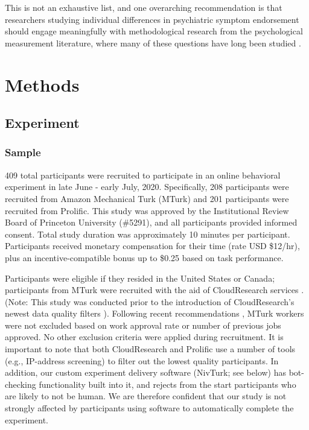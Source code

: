 \documentclass[a4paper,notitlepage,12pt]{article}
\begin{document}
\begin{refsection}[main]
\begin{itemize}
\end{itemize}

This is not an exhaustive list, and one overarching recommendation is that researchers studying individual differences in psychiatric symptom endorsement should engage meaningfully with methodological research from the psychological measurement literature, where many of these questions have long been studied \cite{huang2015insufficient, curran2016methods, thomas2017validity, desimone2018dirty, ophir2020turker}.


\section*{Methods}

\subsection*{Experiment}

\subsubsection*{Sample}

409 total participants were recruited to participate in an online behavioral experiment in late June - early July, 2020. Specifically, 208 participants were recruited from Amazon Mechanical Turk (MTurk) and 201 participants were recruited from Prolific. This study was approved by the Institutional Review Board of Princeton University (\#5291), and all participants provided informed consent. Total study duration was approximately 10 minutes per participant. Participants received monetary compensation for their time (rate USD \$12/hr), plus an incentive-compatible bonus up to \$0.25 based on task performance. 

Participants were eligible if they resided in the United States or Canada; participants from MTurk were recruited with the aid of CloudResearch services \cite{litman2017turkprime}. (Note: This study was conducted prior to the introduction of CloudResearch's newest data quality filters \cite{cloudresearch_2020}). Following recent recommendations \cite{robinson2019tapped}, MTurk workers were not excluded based on work approval rate or number of previous jobs approved. No other exclusion criteria were applied during recruitment. It is important to note that both CloudResearch and Prolific use a number of tools (e.g., IP-address screening) to filter out the lowest quality participants. In addition, our custom experiment delivery software (NivTurk; see below) has bot-checking functionality built into it, and rejects from the start participants who are likely to not be human. We are therefore confident that our study is not strongly affected by participants using software to automatically complete the experiment.


\end{refsection}
\end{document}
